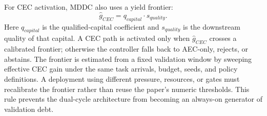 ﻿\documentclass[lettersize,journal]{IEEEtran}
\begin{document}
\begin{table}[!t]
\caption{Formal QG-DCA admission operator}
\label{tab:qgdca_definition}
\centering
\scriptsize
\renewcommand{\arraystretch}{1.12}
\end{table}

For CEC activation, MDDC also uses a yield frontier:
\begin{equation}
\hat{g}_{CEC}=q_{capital}\cdot s_{quality}.
\end{equation}
Here $q_{capital}$ is the qualified-capital coefficient and $s_{quality}$ is the downstream quality of that capital. A CEC path is activated only when $\hat{g}_{CEC}$ crosses a calibrated frontier; otherwise the controller falls back to AEC-only, rejects, or abstains. The frontier is estimated from a fixed validation window by sweeping effective CEC gain under the same task arrivals, budget, seeds, and policy definitions. A deployment using different pressure, resources, or gates must recalibrate the frontier rather than reuse the paper's numeric thresholds. This rule prevents the dual-cycle architecture from becoming an always-on generator of validation debt.
\end{document}
